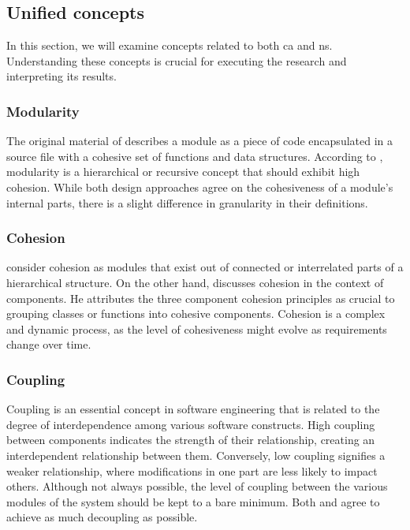 \subsection{Unified concepts}
In this section, we will examine concepts related to both \gls{ca} and \gls{ns}.
Understanding these concepts is crucial for executing the research and interpreting its
results.


\subsubsection{Modularity}
The original material of \textcite[82]{r_c_martin_clean_2018} describes a module as a 
piece of code encapsulated in a source file with a cohesive set of functions and data
structures. According to \textcite[22]{mannaert_normalized_2016}, modularity is a 
hierarchical or recursive concept that should exhibit high cohesion. While both design
approaches agree on the cohesiveness of a module's internal parts, there is a slight 
difference in granularity in their definitions.

\subsubsection{Cohesion}
\textcite[22]{mannaert_normalized_2016} consider cohesion as modules that exist out of
connected or interrelated parts of a hierarchical structure. On the other hand,
\textcite[118]{r_c_martin_clean_2018} discusses cohesion in the context of
components. He attributes the three component cohesion principles as crucial to grouping
classes or functions into cohesive components. Cohesion is a complex and dynamic process,
as the level of cohesiveness might evolve as requirements change over time. 

\subsubsection{Coupling}
Coupling is an essential concept in software engineering that is related to the degree of
interdependence among various software constructs. High coupling between components
indicates the strength of their relationship, creating an interdependent relationship
between them. Conversely, low coupling signifies a weaker relationship, where
modifications in one part are less likely to impact others. Although not always possible,
the level of coupling between the various modules of the system should be kept to a bare
minimum. Both \textcite[23]{mannaert_normalized_2016} and
\textcite[130]{r_c_martin_clean_2018} agree to achieve as much decoupling as possible.